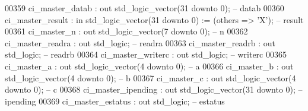 \begin{DoxyCode}
00359             ci\_master\_datab     : \textcolor{keywordflow}{out} \textcolor{comment}{std\_logic\_vector}(\textcolor{vhdllogic}{}\textcolor{vhdllogic}{31} \textcolor{keywordflow}{downto} \textcolor{vhdllogic}{}\textcolor{vhdllogic}{0});                    \textcolor{keyword}{-- datab}
00360             ci\_master\_result    : \textcolor{keywordflow}{in}  \textcolor{comment}{std\_logic\_vector}(\textcolor{vhdllogic}{}\textcolor{vhdllogic}{31} \textcolor{keywordflow}{downto} \textcolor{vhdllogic}{}\textcolor{vhdllogic}{0}) := (\textcolor{keywordflow}{others} => 'X'); \textcolor{keyword}{-- result}
00361             ci\_master\_n         : \textcolor{keywordflow}{out} \textcolor{comment}{std\_logic\_vector}(\textcolor{vhdllogic}{}\textcolor{vhdllogic}{7} \textcolor{keywordflow}{downto} \textcolor{vhdllogic}{}\textcolor{vhdllogic}{0});                     \textcolor{keyword}{-- n}
00362             ci\_master\_readra    : \textcolor{keywordflow}{out} \textcolor{comment}{std\_logic};                                        \textcolor{keyword}{-- readra}
00363             ci\_master\_readrb    : \textcolor{keywordflow}{out} \textcolor{comment}{std\_logic};                                        \textcolor{keyword}{-- readrb}
00364             ci\_master\_writerc   : \textcolor{keywordflow}{out} \textcolor{comment}{std\_logic};                                        \textcolor{keyword}{-- writerc}
00365             ci\_master\_a         : \textcolor{keywordflow}{out} \textcolor{comment}{std\_logic\_vector}(\textcolor{vhdllogic}{}\textcolor{vhdllogic}{4} \textcolor{keywordflow}{downto} \textcolor{vhdllogic}{}\textcolor{vhdllogic}{0});                     \textcolor{keyword}{-- a}
00366             ci\_master\_b         : \textcolor{keywordflow}{out} \textcolor{comment}{std\_logic\_vector}(\textcolor{vhdllogic}{}\textcolor{vhdllogic}{4} \textcolor{keywordflow}{downto} \textcolor{vhdllogic}{}\textcolor{vhdllogic}{0});                     \textcolor{keyword}{-- b}
00367             ci\_master\_c         : \textcolor{keywordflow}{out} \textcolor{comment}{std\_logic\_vector}(\textcolor{vhdllogic}{}\textcolor{vhdllogic}{4} \textcolor{keywordflow}{downto} \textcolor{vhdllogic}{}\textcolor{vhdllogic}{0});                     \textcolor{keyword}{-- c}
00368             ci\_master\_ipending  : \textcolor{keywordflow}{out} \textcolor{comment}{std\_logic\_vector}(\textcolor{vhdllogic}{}\textcolor{vhdllogic}{31} \textcolor{keywordflow}{downto} \textcolor{vhdllogic}{}\textcolor{vhdllogic}{0});                    \textcolor{keyword}{-- ipending}
00369             ci\_master\_estatus   : \textcolor{keywordflow}{out} \textcolor{comment}{std\_logic};                                        \textcolor{keyword}{-- estatus}

\end{DoxyCode}

